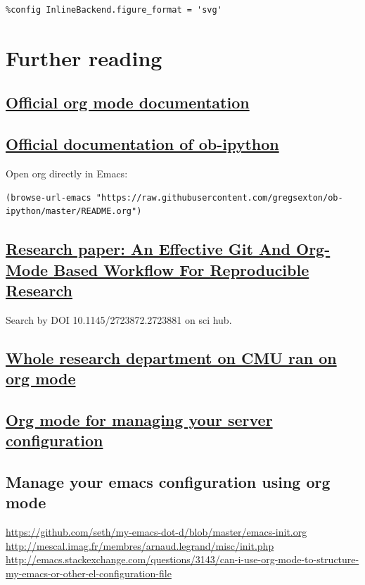 \documentclass[11pt]{article}
\begin{document}
\begin{verbatim}
%config InlineBackend.figure_format = 'svg'
\end{verbatim}
\section{Further reading}
\label{sec:orgheadline61}
\subsection{\href{http://orgmode.org/worg/org-tutorials/org-spreadsheet-intro.html}{Official org mode documentation}}
\label{sec:orgheadline55}
\subsection{\href{https://raw.githubusercontent.com/gregsexton/ob-ipython/master/README.org}{Official documentation of ob-ipython}}
\label{sec:orgheadline56}
Open org directly in Emacs:
\begin{verbatim}
(browse-url-emacs "https://raw.githubusercontent.com/gregsexton/ob-ipython/master/README.org")
\end{verbatim}
\subsection{\href{http://dl.acm.org/citation.cfm?id=2723881}{Research paper: An Effective Git And Org-Mode Based Workflow For Reproducible Research}}
\label{sec:orgheadline57}
Search by DOI 10.1145/2723872.2723881 on sci hub.
\subsection{\href{http://kitchingroup.cheme.cmu.edu/blog/2014/08/08/What-we-are-using-org-mode-for/}{Whole research department on CMU ran on org mode}}
\label{sec:orgheadline58}
\subsection{\href{http://www.howardism.org/Technical/Emacs/literate-devops.html}{Org mode for managing your server configuration}}
\label{sec:orgheadline59}
\subsection{Manage your emacs configuration using org mode}
\label{sec:orgheadline60}
\url{https://github.com/seth/my-emacs-dot-d/blob/master/emacs-init.org}
\url{http://mescal.imag.fr/membres/arnaud.legrand/misc/init.php}
\url{http://emacs.stackexchange.com/questions/3143/can-i-use-org-mode-to-structure-my-emacs-or-other-el-configuration-file}
\end{document}
